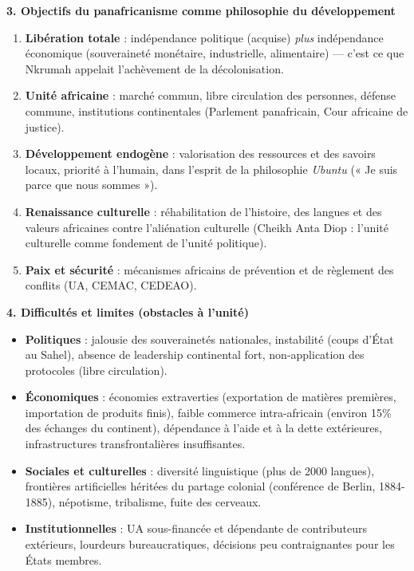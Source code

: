 \documentclass[11pt]{article}
\begin{document}
\textbf{3. Objectifs du panafricanisme comme philosophie du développement}
\begin{enumerate}
  \item \textbf{Libération totale} : indépendance politique (acquise) \emph{plus} indépendance économique (souveraineté monétaire, industrielle, alimentaire) — c'est ce que Nkrumah appelait l'achèvement de la décolonisation.
  \item \textbf{Unité africaine} : marché commun, libre circulation des personnes, défense commune, institutions continentales (Parlement panafricain, Cour africaine de justice).
  \item \textbf{Développement endogène} : valorisation des ressources et des savoirs locaux, priorité à l'humain, dans l'esprit de la philosophie \emph{Ubuntu} (« Je suis parce que nous sommes »).
  \item \textbf{Renaissance culturelle} : réhabilitation de l'histoire, des langues et des valeurs africaines contre l'aliénation culturelle (Cheikh Anta Diop : l'unité culturelle comme fondement de l'unité politique).
  \item \textbf{Paix et sécurité} : mécanismes africains de prévention et de règlement des conflits (UA, CEMAC, CEDEAO).
\end{enumerate}

\textbf{4. Difficultés et limites (obstacles à l'unité)}
\begin{itemize}
  \item \textbf{Politiques} : jalousie des souverainetés nationales, instabilité (coups d'État au Sahel), absence de leadership continental fort, non-application des protocoles (libre circulation).
  \item \textbf{Économiques} : économies extraverties (exportation de matières premières, importation de produits finis), faible commerce intra-africain (environ 15\% des échanges du continent), dépendance à l'aide et à la dette extérieures, infrastructures transfrontalières insuffisantes.
  \item \textbf{Sociales et culturelles} : diversité linguistique (plus de 2000 langues), frontières artificielles héritées du partage colonial (conférence de Berlin, 1884-1885), népotisme, tribalisme, fuite des cerveaux.
  \item \textbf{Institutionnelles} : UA sous-financée et dépendante de contributeurs extérieurs, lourdeurs bureaucratiques, décisions peu contraignantes pour les États membres.
\end{itemize}
\end{document}
